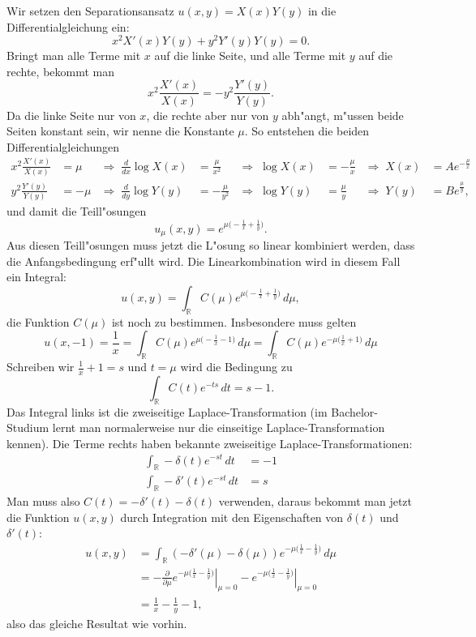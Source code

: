 {\begin{loesung}
Wir setzen den Separationsansatz $u(x,y)=X(x)Y(y)$ in die
Differentialgleichung ein:
\[
x^2X'(x)Y(y)+y^2Y'(y)Y(y)=0.
\]
Bringt man alle Terme mit $x$ auf die linke Seite, und alle Terme
mit $y$ auf die rechte, bekommt man
\[
x^2\frac{X'(x)}{X(x)}=- y^2\frac{Y'(y)}{Y(y)}.
\]
Da die linke Seite nur von $x$, die rechte aber nur von $y$ abh"angt,
m"ussen beide Seiten konstant sein, wir nenne die Konstante $\mu$.
So entstehen die beiden Differentialgleichungen
\begin{align*}
x^2\frac{X'(x)}{X(x)}&=\mu
&
\Rightarrow\;
\frac{d}{dx}\log X(x)&=\frac{\mu}{x^2}
&
\Rightarrow\;
\log X(x)&=-\frac{\mu}{x}
&
\Rightarrow\;
X(x)&=Ae^{-\frac{\mu}{x}}
\\
y^2\frac{Y'(y)}{Y(y)}&=-\mu
&
\Rightarrow\;
\frac{d}{dy}\log Y(y)&=-\frac{\mu}{y^2}
&
\Rightarrow\;
\log Y(y)&=\frac{\mu}{y}
&
\Rightarrow\;
Y(y)&=Be^{\frac{\mu}{y}},
\end{align*}
und damit die Teill"osungen
\[
u_\mu(x,y)=e^{\mu\bigl(-\frac1x+\frac1y\bigr)}.
\]
Aus diesen Teill"osungen muss jetzt die L"osung so linear kombiniert
werden, dass die Anfangsbedingung erf"ullt wird. Die Linearkombination
wird in diesem Fall ein Integral:
\[
u(x,y)=\int_{\mathbb R}C(\mu)
e^{\mu\bigl(-\frac1x+\frac1y\bigr)}\,d\mu,
\]
die Funktion $C(\mu)$ ist noch zu bestimmen.
Insbesondere muss gelten
\[
u(x,-1)
=
\frac1x
=
\int_{\mathbb R}C(\mu)e^{\mu\bigl(-\frac1x-1)}\,d\mu
=
\int_{\mathbb R}C(\mu)e^{-\mu\bigl(\frac1x+1)}\,d\mu
\]
Schreiben wir $\frac1x+1=s$ und $t=\mu$ wird die Bedingung
zu
\[
\int_{\mathbb R}C(t)e^{-ts}\,dt=s-1.
\]
Das Integral links ist die zweiseitige Laplace-Transformation
(im Bachelor-Studium lernt man normalerweise nur die einseitige
Laplace-Transformation kennen). Die Terme rechts haben bekannte
zweiseitige Laplace-Transformationen:
\begin{align*}
\int_{\mathbb R}-\delta(t)e^{-st}\,dt&=-1\\
\int_{\mathbb R}-\delta'(t)e^{-st}\,dt&=s
\end{align*}
Man muss also $C(t)=-\delta'(t)-\delta(t)$ verwenden, daraus bekommt
man jetzt die Funktion $u(x,y)$ durch Integration mit den Eigenschaften
von $\delta(t)$ und $\delta'(t)$:
\begin{align*}
u(x,y)
&=
\int_{\mathbb R}
(-\delta'(\mu)-\delta(\mu))
e^{-\mu\bigl(\frac1x-\frac1y\bigr)}\,d\mu
\\
&=
-\left.\frac{\partial}{\partial \mu}
e^{-\mu\bigl(\frac1x-\frac1y\bigr)}\right|_{\mu=0}
-
\left.e^{-\mu\bigl(\frac1x-\frac1y\bigr)}\right|_{\mu=0}
\\
&=
\frac1x-\frac1y-1,
\end{align*}
also das gleiche Resultat wie vorhin.
\end{loesung}
}{}
